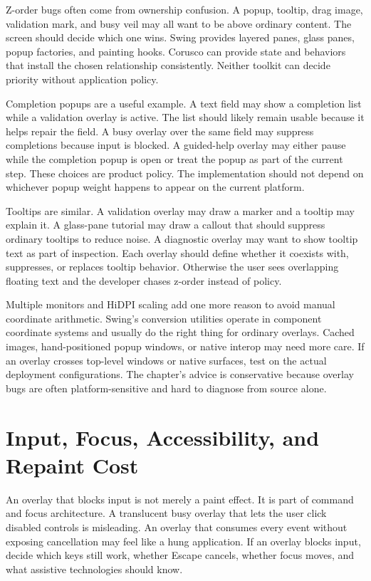 Z-order bugs often come from ownership confusion. A popup, tooltip, drag image, validation mark, and busy veil may all want to be above ordinary content. The screen should decide which one wins. Swing provides layered panes, glass panes, popup factories, and painting hooks. Corusco can provide state and behaviors that install the chosen relationship consistently. Neither toolkit can decide priority without application policy.

Completion popups are a useful example. A text field may show a completion list
while a validation overlay is active. The list should likely remain usable
because it helps repair the field. A busy overlay over the same field may
suppress completions because input is blocked. A guided-help overlay may either
pause while the completion popup is open or treat the popup as part of the
current step. These choices are product policy. The implementation should not
depend on whichever popup weight happens to appear on the current platform.

Tooltips are similar. A validation overlay may draw a marker and a tooltip may
explain it. A glass-pane tutorial may draw a callout that should suppress
ordinary tooltips to reduce noise. A diagnostic overlay may want to show tooltip
text as part of inspection. Each overlay should define whether it coexists with,
suppresses, or replaces tooltip behavior. Otherwise the user sees overlapping
floating text and the developer chases z-order instead of policy.

Multiple monitors and HiDPI scaling add one more reason to avoid manual
coordinate arithmetic. Swing's conversion utilities operate in component
coordinate systems and usually do the right thing for ordinary overlays. Cached
images, hand-positioned popup windows, or native interop may need more care.
If an overlay crosses top-level windows or native surfaces, test on the actual
deployment configurations. The chapter's advice is conservative because overlay
bugs are often platform-sensitive and hard to diagnose from source alone.

\section{Input, Focus, Accessibility, and Repaint Cost}

An overlay that blocks input is not merely a paint effect. It is part of command and focus architecture. A translucent busy overlay that lets the user click disabled controls is misleading. An overlay that consumes every event without exposing cancellation may feel like a hung application. If an overlay blocks input, decide which keys still work, whether Escape cancels, whether focus moves, and what assistive technologies should know.

